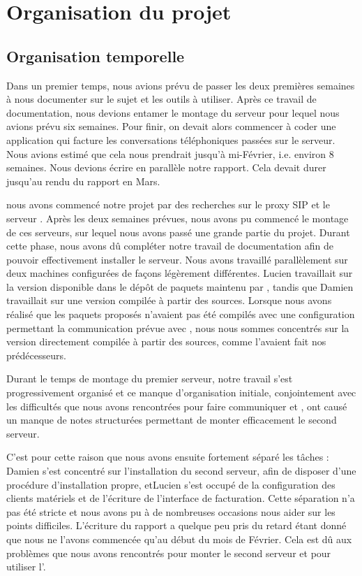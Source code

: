 \section{Organisation du projet}

\subsection{Organisation temporelle}




Dans un premier temps, nous avions prévu de passer les deux premières semaines à nous documenter sur le sujet et les outils à utiliser. Après ce travail de documentation, nous devions entamer le montage du serveur pour lequel nous avions prévu six semaines. Pour finir, on devait alors commencer à coder une application qui facture les conversations téléphoniques passées sur le serveur. Nous avions	estimé que cela nous prendrait jusqu'à mi-Février, i.e. environ 8 semaines. Nous devions écrire en parallèle notre rapport. Cela devait durer jusqu'au rendu du rapport en Mars. 

 nous avons commencé notre projet par des recherches sur le proxy SIP {\kam} et le serveur {\frad}. Après les deux semaines prévues, nous avons pu commencé le montage de ces serveurs, sur lequel nous avons passé une grande partie du projet. Durant cette phase, nous avons dû compléter notre travail de documentation afin de pouvoir effectivement installer le serveur.
Nous avons travaillé parallèlement sur deux machines configurées de façons légèrement différentes. Lucien travaillait sur la version disponible dans le dépôt de paquets maintenu par {\kam}, tandis que Damien travaillait sur une version compilée à partir des sources. Lorsque nous avons réalisé que les paquets proposés n’avaient pas été compilés avec une configuration permettant la communication prévue avec {\frad}, nous nous sommes concentrés sur la version directement compilée à partir des sources, comme l’avaient fait nos prédécesseurs.


Durant le temps de montage du premier serveur, notre travail s’est progressivement organisé et ce manque d’organisation initiale, conjointement avec les difficultés que nous avons rencontrées pour faire communiquer {\kam} et {\frad}, ont causé un manque de notes structurées permettant de monter efficacement le second serveur.

C’est pour cette raison que nous avons ensuite fortement séparé les tâches : Damien s’est concentré sur l’installation du second serveur, afin de disposer d’une procédure d’installation propre, et Lucien s’est occupé de la configuration des clients matériels et de l’écriture de l’interface de facturation. Cette séparation n’a pas été stricte et nous avons pu à de nombreuses occasions nous aider sur les points difficiles.
L'écriture du rapport a quelque peu pris du retard étant donné que nous ne l'avons commencée qu'au début du mois de Février. Cela est dû aux problèmes que nous avons rencontrés pour monter le second serveur et pour utiliser l'{\ata}.

